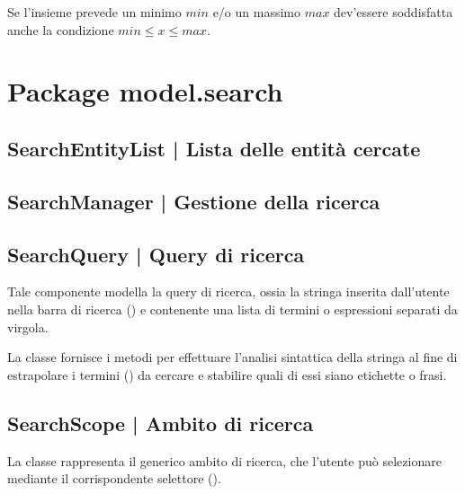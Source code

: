 \documentclass[10pt,a4paper,headinclude,footinclude,hidelinks]{scrreprt} %
\begin{document}
	Se l'insieme prevede un minimo $min$ e/o un massimo $max$ dev'essere soddisfatta anche la condizione $min \leq x \leq max$.

	\section{Package model.search}
	\label{sec:stage:design:sistema:model.search}

	\subsection[SearchEntityList]{SearchEntityList | Lista delle entità cercate}
	\label{sec:stage:design:sistema:model.search:search-entity-list}

	\subsection[SearchManager]{SearchManager | Gestione della ricerca}
	\label{sec:stage:design:sistema:model.search:search-manager}


	\subsection[SearchQuery]{SearchQuery | Query di ricerca}
	\label{sec:stage:design:sistema:model.search:search-query}
	Tale componente modella la query di ricerca, ossia la stringa inserita dall'utente nella barra di ricerca (\textit{}) e contenente una lista di termini o espressioni separati da virgola.

	La classe fornisce i metodi per effettuare l'analisi sintattica della stringa al fine di estrapolare i termini (\textit{}) da cercare e stabilire quali di essi siano etichette o frasi.

	\subsection[SearchScope]{SearchScope | Ambito di ricerca}
	\label{sec:stage:design:sistema:model.search:search-scope}
	La classe rappresenta il generico ambito di ricerca, che l'utente può selezionare mediante il corrispondente selettore (\textit{}).
\end{document}
